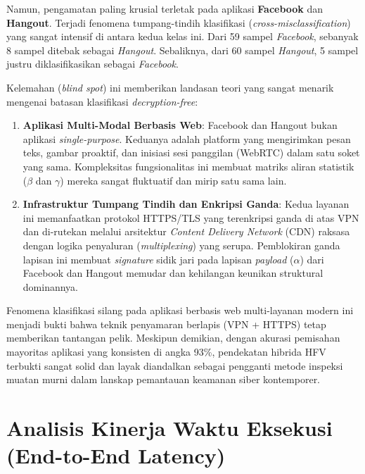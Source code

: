 Namun, pengamatan paling krusial terletak pada aplikasi \textbf{Facebook} dan \textbf{Hangout}. Terjadi fenomena tumpang-tindih klasifikasi (\textit{cross-misclassification}) yang sangat intensif di antara kedua kelas ini. Dari 59 sampel \textit{Facebook}, sebanyak 8 sampel ditebak sebagai \textit{Hangout}. Sebaliknya, dari 60 sampel \textit{Hangout}, 5 sampel justru diklasifikasikan sebagai \textit{Facebook}. 

Kelemahan (\textit{blind spot}) ini memberikan landasan teori yang sangat menarik mengenai batasan klasifikasi \textit{decryption-free}:
\begin{enumerate}
    \item \textbf{Aplikasi Multi-Modal Berbasis Web}: Facebook dan Hangout bukan aplikasi \textit{single-purpose}. Keduanya adalah platform yang mengirimkan pesan teks, gambar proaktif, dan inisiasi sesi panggilan (WebRTC) dalam satu soket yang sama. Kompleksitas fungsionalitas ini membuat matriks aliran statistik ($\beta$ dan $\gamma$) mereka sangat fluktuatif dan mirip satu sama lain.
    \item \textbf{Infrastruktur Tumpang Tindih dan Enkripsi Ganda}: Kedua layanan ini memanfaatkan protokol HTTPS/TLS yang terenkripsi ganda di atas VPN dan di-rutekan melalui arsitektur \textit{Content Delivery Network} (CDN) raksasa dengan logika penyaluran (\textit{multiplexing}) yang serupa. Pemblokiran ganda lapisan ini membuat \textit{signature} sidik jari pada lapisan \textit{payload} ($\alpha$) dari Facebook dan Hangout memudar dan kehilangan keunikan struktural dominannya.
\end{enumerate}

Fenomena klasifikasi silang pada aplikasi berbasis web multi-layanan modern ini menjadi bukti bahwa teknik penyamaran berlapis (VPN + HTTPS) tetap memberikan tantangan pelik. Meskipun demikian, dengan akurasi pemisahan mayoritas aplikasi yang konsisten di angka 93\%, pendekatan hibrida HFV terbukti sangat solid dan layak diandalkan sebagai pengganti metode inspeksi muatan murni dalam lanskap pemantauan keamanan siber kontemporer.

\section{Analisis Kinerja Waktu Eksekusi (End-to-End Latency)}
\label{sec:bab4-waktu-eksekusi}

